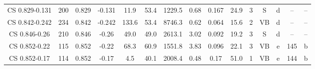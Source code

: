 \begin{table}
\begin{tabular}{ccccccccccccccc}
CS 0.829-0.131 & 200 & 0.829 & -0.131 & 11.9 & 53.4 & 1229.5 & 0.68 & 0.167 & 24.9 & 3 & S & d & -- & -- \\
CS 0.842-0.242 & 234 & 0.842 & -0.242 & 133.6 & 53.4 & 8746.3 & 0.62 & 0.064 & 15.6 & 2 & VB & d & -- & -- \\
CS 0.846-0.26 & 210 & 0.846 & -0.26 & 49.0 & 49.0 & 2613.1 & 3.02 & 0.092 & 19.2 & 3 & S & d & -- & -- \\
CS 0.852-0.22 & 115 & 0.852 & -0.22 & 68.3 & 60.9 & 1551.8 & 3.83 & 0.096 & 22.1 & 3 & VB & e & 145 & b \\
CS 0.852-0.17 & 114 & 0.852 & -0.17 & 4.5 & 40.1 & 2008.4 & 0.48 & 0.17 & 51.0 & 1 & VB & e & 144 & b \\
\end{tabular}
\end{table}
